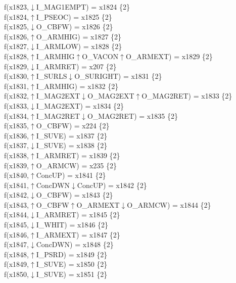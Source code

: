 f(x1823,$\downarrow$I\_MAG1EMPT) = x1824 \{2\} \\  
f(x1824,$\uparrow$I\_PSEOC) = x1825 \{2\} \\  
f(x1825,$\downarrow$O\_CBFW) = x1826 \{2\} \\  
f(x1826,$\uparrow$O\_ARMHIG) = x1827 \{2\} \\  
f(x1827,$\downarrow$I\_ARMLOW) = x1828 \{2\} \\  
f(x1828,$\uparrow$I\_ARMHIG$\uparrow$O\_VACON$\uparrow$O\_ARMEXT) = x1829 \{2\} \\  
f(x1829,$\downarrow$I\_ARMRET) = x207 \{2\} \\  
f(x1830,$\uparrow$I\_SURLS$\downarrow$O\_SURIGHT) = x1831 \{2\} \\  
f(x1831,$\uparrow$I\_ARMHIG) = x1832 \{2\} \\  
f(x1832,$\uparrow$I\_MAG2EXT$\downarrow$O\_MAG2EXT$\uparrow$O\_MAG2RET) = x1833 \{2\} \\  
f(x1833,$\downarrow$I\_MAG2EXT) = x1834 \{2\} \\  
f(x1834,$\uparrow$I\_MAG2RET$\downarrow$O\_MAG2RET) = x1835 \{2\} \\  
f(x1835,$\uparrow$O\_CBFW) = x224 \{2\} \\  
f(x1836,$\uparrow$I\_SUVE) = x1837 \{2\} \\  
f(x1837,$\downarrow$I\_SUVE) = x1838 \{2\} \\  
f(x1838,$\uparrow$I\_ARMRET) = x1839 \{2\} \\  
f(x1839,$\uparrow$O\_ARMCW) = x235 \{2\} \\  
f(x1840,$\uparrow$ConcUP) = x1841 \{2\} \\  
f(x1841,$\uparrow$ConcDWN$\downarrow$ConcUP) = x1842 \{2\} \\  
f(x1842,$\downarrow$O\_CBFW) = x1843 \{2\} \\  
f(x1843,$\uparrow$O\_CBFW$\uparrow$O\_ARMEXT$\downarrow$O\_ARMCW) = x1844 \{2\} \\  
f(x1844,$\downarrow$I\_ARMRET) = x1845 \{2\} \\  
f(x1845,$\downarrow$I\_WHIT) = x1846 \{2\} \\  
f(x1846,$\uparrow$I\_ARMEXT) = x1847 \{2\} \\  
f(x1847,$\downarrow$ConcDWN) = x1848 \{2\} \\  
f(x1848,$\uparrow$I\_PSRD) = x1849 \{2\} \\  
f(x1849,$\uparrow$I\_SUVE) = x1850 \{2\} \\  
f(x1850,$\downarrow$I\_SUVE) = x1851 \{2\} \\  
